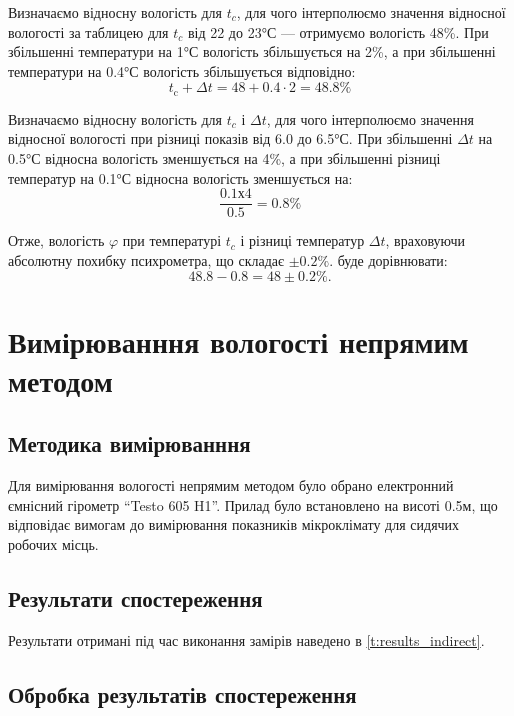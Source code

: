 Визначаємо відносну вологість для $t_c$, для чого інтерполюємо значення відносної вологості
за таблицею для $t_c$ від 22 до 23°С --- отримуємо вологість 48\%. При збільшенні температури на 1°С
вологість збільшується на 2\%, а при збільшенні температури на 0.4°С вологість збільшується
відповідно:
\begin{equation}
  t_{\text{c}} + \Delta t  =  48 +  0.4 \cdot 2 = 48.8\%
\end{equation}

Визначаємо відносну вологість для $t_c$ і $\Delta t$, для чого інтерполюємо значення відносної
вологості при різниці показів від 6.0 до 6.5°С. При збільшенні $\Delta t$ на 0.5°С відносна
вологість зменшується на 4\%, а при збільшенні різниці температур на 0.1°С відносна вологість
зменшується на:
\begin{equation}
  \frac{0.1х4}{0.5}=0.8\%
\end{equation}

Отже, вологість $\varphi$ при температурі $t_c$ і різниці температур $\Delta t$, враховуючи
абсолютну похибку психрометра, що складає $\pm 0.2\%$. буде дорівнювати:
\begin{equation}
  48.8 - 0.8 = 48 \pm 0.2\%.
\end{equation}

\section{Вимірюванння вологості непрямим методом}

\subsection{Методика вимірюванння}

Для вимірювання вологості непрямим методом було обрано електронний ємнісний гірометр ``Testo 605
H1''. Прилад було встановлено на висоті 0.5м, що відповідає вимогам до вимірювання показників
мікроклімату для сидячих робочих місць.

\subsection{Результати спостереження}

Результати отримані під час виконання замірів наведено в \ref{t:results_indirect}.
\pagebreak
\setlength{\mathindent}{0pt}

\pagebreak

\subsection{Обробка результатів спостереження}

